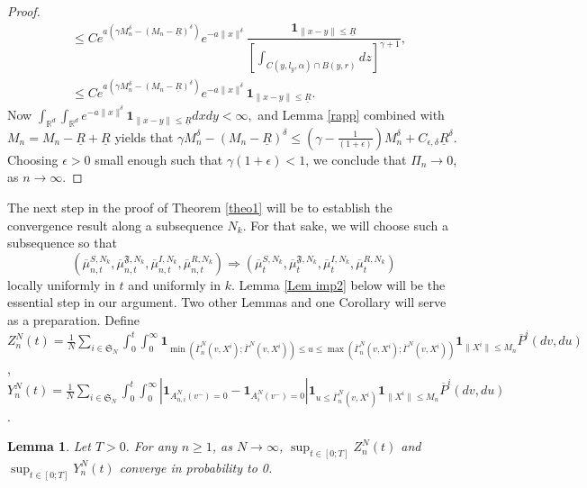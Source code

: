 \documentclass[notitlepage,reqno,11pt]{amsart}
\numberwithin{equation}{section}
\newtheorem{lemma}{Lemma}[section]
\def\R{\mathbb{R}}
\begin{document}
\begin{proof}
\begin{align}
&\leq Ce^{a\left(\gamma M_n^{\delta}-( M_n-\underline{R})^{\delta}\right)} e^{-a\|x\|^{\delta}} \dfrac{\mathbf{1}_{\|x-y\|\leq \underline{R}} }{\left[\displaystyle\int_{C(y,l_y,\alpha)\cap B(y,r)}dz\right]^{\gamma+1}},\nonumber\\
&\leq  Ce^{a\left(\gamma M_n^{\delta}-( M_n-\underline{R})^{\delta}\right)} e^{-a\|x\|^{\delta}} \mathbf{1}_{\|x-y\|\leq \underline{R}}\nonumber.
\end{align}
Now $\displaystyle \int_{\R^d} \int_{\R^d} e^{-a\|x\|^{\delta}} \mathbf{1}_{\|x-y\|\leq \underline{R}}dxdy<\infty,$ and Lemma \ref{rapp} combined with $M_n=M_n-\underline{R}+\underline{R}$ yields that $\gamma M_n^{\delta}-( M_n-\underline{R})^{\delta}\leq (\gamma-\frac{1}{(1+\epsilon)})M_n^{\delta}+C_{\epsilon,\delta}\underline{R}^{\delta}$. Choosing  $\epsilon>0$ small enough such that $\gamma(1+\epsilon)< 1$,  we conclude that $\Pi_{n} \rightarrow 0$, as  $n\rightarrow \infty$.
\end{proof}
The next step in the proof of Theorem \ref{theo1} will be to establish the convergence result along a subsequence $N_k$. For that sake, we will choose such a subsequence so that 
\[(\overline{\mu}^{S,N_k}_{n,t}, \overline{\mu}_{n,t}^{\mathfrak{F},N_k},\overline{\mu}_{n,t}^{I,N_k},\overline{\mu}_{n,t}^{R,N_k})\Rightarrow
 (\overline{\mu}^{S,N_k}_t, \overline{\mu}_t^{\mathfrak{F},N_k},\overline{\mu}_t^{I,N_k},\overline{\mu}_t^{R,N_k})\]
 locally uniformly in $t$ and uniformly in $k$.
Lemma \ref{Lem imp2} below will be the essential step in our argument. Two other Lemmas and one Corollary will serve as a preparation.
Define\\
$\displaystyle Z_n^N(t)= \displaystyle \frac{1}{N}\sum_{i\in\mathfrak{S}_N}  \int_{0}^{t}\int_0^{\infty} \mathbf{1}_{\min \left(\overline{\Gamma}_{n}^{N}(v,X^i);\overline{\Gamma}^{N}(v,X^i)\right)\leq u\leq \max \left(\overline{\Gamma}_{n}^{N}(v,X^i);\overline{\Gamma}^{N}(v,X^i)\right)} \mathbf{1}_{\|X^i\|\leq M_n}\overline{P}^{i}(dv,du)$,\\
$\displaystyle Y^N_n(t)=\displaystyle\frac{1}{N}\sum_{i\in\mathfrak{S}_N}  \int_{0}^{t}\int_{0}^{\infty}\left|\mathbf{1}_{A^N_{n,i}(v^{-}) = 0}-\mathbf{1}_{A^N_{i}(v^{-}) = 0}\right|\mathbf{1}_{u\leq \overline{\Gamma}_{n}^{N}(v,X^i)}\mathbf{1}_{\|X^i\|\leq M_n}\overline{P}^{i}(dv,du)$.
\begin{lemma}
\label{lem}
Let $T>0.$ For any $n\geq 1$, as $N\rightarrow \infty$,  $\displaystyle \sup_{t\in[0;T]}Z_n^N(t)$  and $\displaystyle \sup_{t\in[0;T]}Y_n^N(t)$ converge in probability  to 0.
\end{lemma}
\end{document}
